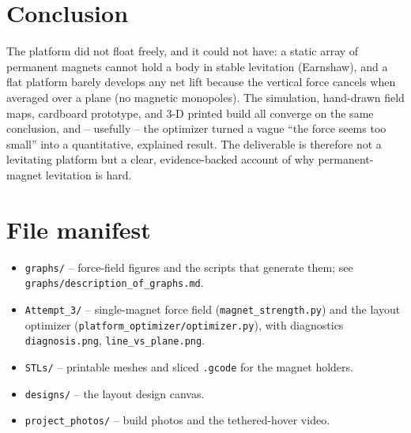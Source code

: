 \documentclass[11pt]{article}
\begin{document}
\section{Conclusion}

The platform did not float freely, and it could not have: a static array of
permanent magnets cannot hold a body in stable levitation (Earnshaw), and a flat
platform barely develops any net lift because the vertical force cancels when
averaged over a plane (no magnetic monopoles). The simulation, hand-drawn field
maps, cardboard prototype, and 3-D printed build all converge on the same
conclusion, and -- usefully -- the optimizer turned a vague ``the force seems
too small'' into a quantitative, explained result. The deliverable is therefore
not a levitating platform but a clear, evidence-backed account of why
permanent-magnet levitation is hard.

\appendix
\section{File manifest}

\sloppy
\begin{itemize}
  \item \texttt{graphs/} -- force-field figures and the scripts that generate
        them; see \texttt{graphs/description\_of\_graphs.md}.
  \item \texttt{Attempt\_3/} -- single-magnet force field
        (\texttt{magnet\_strength.py}) and the layout optimizer
        (\texttt{platform\_optimizer/optimizer.py}), with diagnostics
        \texttt{diagnosis.png}, \texttt{line\_vs\_plane.png}.
  \item \texttt{STLs/} -- printable meshes and sliced \texttt{.gcode} for the
        magnet holders.
  \item \texttt{designs/} -- the layout design canvas.
  \item \texttt{project\_photos/} -- build photos and the tethered-hover video.
\end{itemize}
\end{document}
